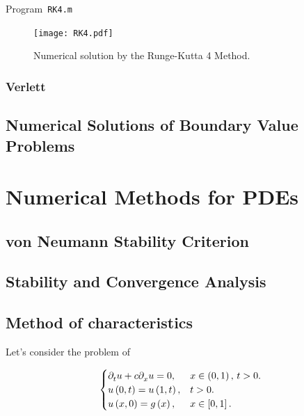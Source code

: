 \begin{listing}[ht!]
	\tiny
	\centering
	\caption{Program~\texttt{RK4.m}}
	\label{code:RK2.m}
\end{listing}

\begin{figure}[ht!]
	\centering
	\texttt{[image: RK4.pdf]}
	\caption{Numerical solution by the Runge-Kutta 4 Method.}
\end{figure}

\subsection{Verlett}

\section{Numerical Solutions of Boundary Value Problems}

\chapter{Numerical Methods for PDEs}

\section{von Neumann Stability Criterion}

\section{Stability and Convergence Analysis}

\section{Method of characteristics}

\cite{Choksi2022,Arrigo2023}

Let's consider the problem of

\begin{equation*}
	\begin{cases}
		\difcp{u}{t}+
		c\difcp{u}{x}=0,   & x\in\left(0,1\right),\, t>0. \\
		u\left(0,t\right)=
		u\left(1,t\right), & t>0.                         \\
		u\left(x,0\right)=
		g\left(x\right),   & x\in\left[0,1\right].
	\end{cases}
\end{equation*}

